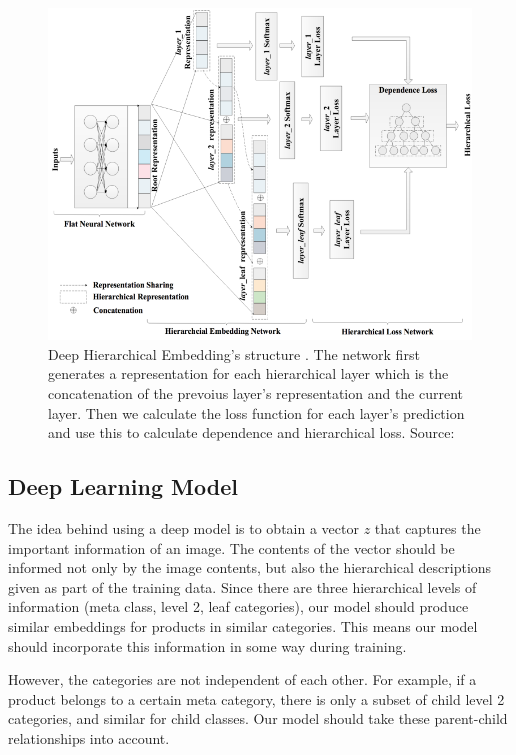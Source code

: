\documentclass[conference]{IEEEtran}
\begin{document}
\begin{figure}[!t]
	\centering
	\includegraphics[scale=0.30]{network}
	\caption{Deep Hierarchical Embedding's structure . 
	The network first generates a representation for each hierarchical layer which is the concatenation
	of the prevoius layer's representation and the current layer. Then we calculate the loss
	function for each layer's prediction and use this to calculate dependence and hierarchical loss.
	Source:~\cite{gao2020deep}}
	\label{fig:network}
\end{figure}
\subsection{Deep Learning Model}
The idea behind using a deep model is to obtain a vector $z$ that captures the important
information of an image.
The contents of the vector should be informed not only by the image contents, but also the 
hierarchical descriptions given as part of the training data.
Since there are three hierarchical levels of information (meta class, level 2, leaf categories),
our model should produce similar embeddings for products in similar categories.
This means our model should incorporate this information in some way during training.

However, the categories are not independent of each other.
For example, if a product belongs to a certain meta category, 
there is only a subset of child level 2 categories, and similar for 
child classes.
Our model should take these parent-child relationships into account.
\end{document}

